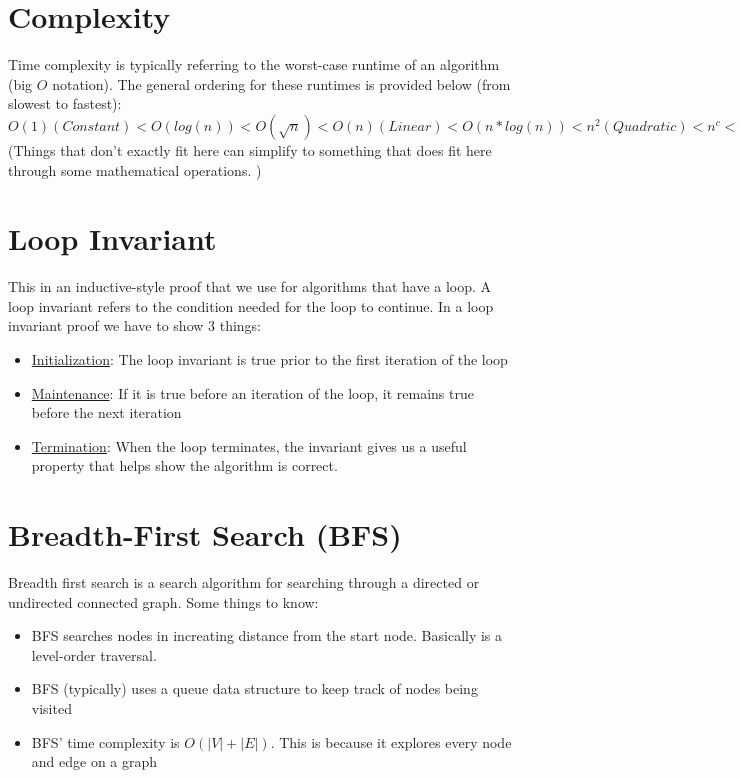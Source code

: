 \documentclass{article}
\begin{document}
\section{Complexity}
Time complexity is typically referring to the worst-case runtime of an algorithm (big $O$ notation). The general ordering for these runtimes is provided below (from slowest to fastest):
$O(1) (Constant) < O(log(n)) < O(\sqrt{n}) < O(n) (Linear) < O(n*log(n)) < n^2 (Quadratic) < n^c < 2^n (Exponential) < c^n < n! (Factorial) < n^n$
(Things that don't exactly fit here can simplify to something that does fit here through some mathematical operations. )

\section{Loop Invariant}
This in an inductive-style proof that we use for algorithms that have a loop. A loop invariant refers to the condition needed for the loop to continue. In a loop invariant proof we have to show 3 things:
\begin{itemize}
    \item \underline{Initialization}: The loop invariant is true prior to the first iteration of the loop
    \item \underline{Maintenance}: If it is true before an iteration of the loop, it remains true before the next iteration
    \item \underline{Termination}: When the loop terminates, the invariant gives us a useful property that helps show the algorithm is correct.
\end{itemize}

\section{Breadth-First Search (BFS)}
Breadth first search is a search algorithm for searching through a directed or undirected connected graph. Some things to know:

\begin{itemize}
    \item BFS searches nodes in increating distance from the start node. Basically is a level-order traversal.
    \item BFS (typically) uses a queue data structure to keep track of nodes being visited
    \item BFS' time complexity is $O(|V|+|E|)$. This is because it explores every node and edge on a graph
\end{itemize}
\end{document}
